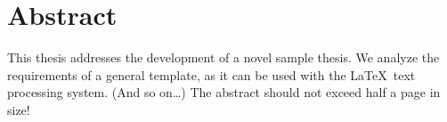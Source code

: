 \chapter*{Abstract}

This thesis addresses the development of a novel sample thesis. We analyze the requirements of a general template, as it can be used with the \LaTeX\ text processing system. (And so on\dots) The abstract should not exceed half a page in size!

\cleardoublepage
